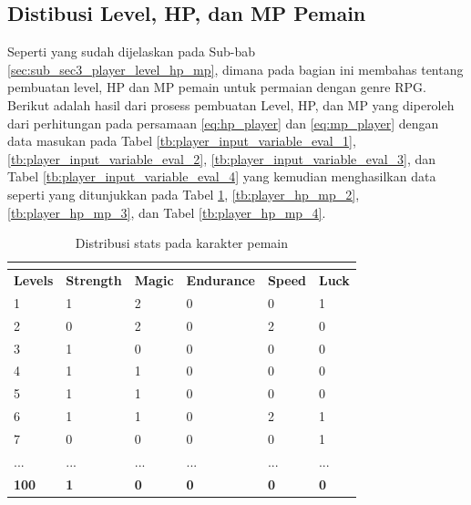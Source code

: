 \subsection{Distibusi Level, HP, dan MP Pemain}
\label{sec:sub_sec4_eval_dist_hp_mp_level_multi-character}
\vspace{1ex}

Seperti yang sudah dijelaskan pada Sub-bab \ref{sec:sub_sec3_player_level_hp_mp}, dimana pada bagian ini membahas tentang pembuatan level, HP dan MP pemain untuk permaian dengan genre RPG. Berikut adalah hasil dari prosess pembuatan Level, HP, dan MP yang diperoleh dari perhitungan pada persamaan \ref{eq:hp_player} dan \ref{eq:mp_player} dengan data masukan pada Tabel \ref{tb:player_input_variable_eval_1}, \ref{tb:player_input_variable_eval_2}, \ref{tb:player_input_variable_eval_3}, dan Tabel \ref{tb:player_input_variable_eval_4} yang kemudian menghasilkan data seperti yang ditunjukkan pada Tabel \ref{tb:player_hp_mp_1}, \ref{tb:player_hp_mp_2}, \ref{tb:player_hp_mp_3}, dan Tabel \ref{tb:player_hp_mp_4}.

\begin{longtable}{|l|l|l|l|l|l|}
	\caption{Distribusi stats pada karakter pemain}
	\vspace{1ex}
	\label{tb:player_hp_mp_1}\\
	\hline
	\rowcolor[HTML]{C0C0C0} 
	\textbf{Levels} & \textbf{Strength} & \textbf{Magic} & \textbf{Endurance} & \textbf{Speed} & \textbf{Luck} \\ \hline
	1 & 1 & 2 & 0 & 0 & 1 \\ \hline
	2 & 0 & 2 & 0 & 2 & 0 \\ \hline
	3 & 1 & 0 & 0 & 0 & 0 \\ \hline
	4 & 1 & 1 & 0 & 0 & 0 \\ \hline
	5 & 1 & 1 & 0 & 0 & 0 \\ \hline
	6 & 1 & 1 & 0 & 2 & 1 \\ \hline
	7 & 0 & 0 & 0 & 0 & 1 \\ \hline
	... & ... & ... & ... & ... & ... \\ \hline
	\textbf{100} & \textbf{1} & \textbf{0} & \textbf{0} & \textbf{0} & \textbf{0} \\ \hline
\end{longtable}
\vspace{-1ex}

